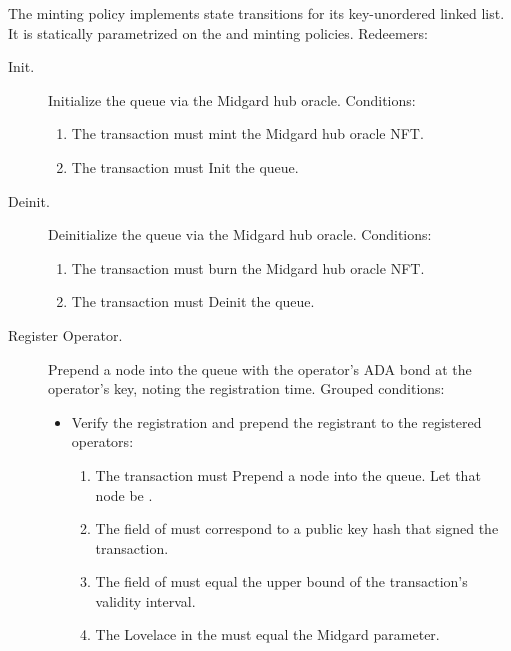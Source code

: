 \documentclass[../midgard.tex]{subfiles}
\begin{document}
The  minting policy implements state transitions for its key-unordered linked list. It is statically parametrized on the  and  minting policies. Redeemers:
\begin{description}
    \item[Init.] Initialize the  queue via the Midgard hub oracle. Conditions:
        \begin{enumerate}
            \item The transaction must mint the Midgard hub oracle NFT.
            \item The transaction must Init the  queue.
        \end{enumerate}
    \item[Deinit.] Deinitialize the  queue via the Midgard hub oracle. Conditions:
        \begin{enumerate}
            \item The transaction must burn the Midgard hub oracle NFT.
            \item The transaction must Deinit the  queue.
        \end{enumerate}
    \item[Register Operator.] Prepend a node into the  queue with the operator's ADA bond at the operator's key, noting the registration time. Grouped conditions:
        \begin{itemize}
            \item Verify the registration and prepend the registrant to the registered operators:
            \begin{enumerate}
                \item The transaction must Prepend a node into the  queue. Let that node be .
                \item The  field of  must correspond to a public key hash that signed the transaction.
                \item The  field of  must equal the upper bound of the transaction's validity interval.
                \item The Lovelace in the  must equal the  Midgard parameter.
            \end{enumerate}

\end{itemize}
\end{description}
\end{document}
